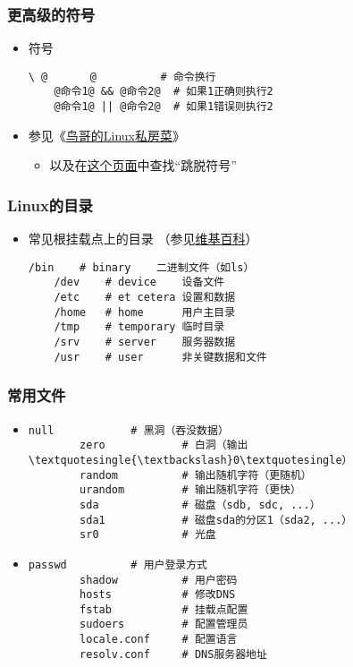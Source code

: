 \begin{CJK}{UTF8}{gbsn}
\begin{frame} [fragile]
	\frametitle{更高级的符号}
	\linespread{1.5}
	\begin{itemize}
	\item 符号
	\begin{lstlisting}[style=bashstyle, gobble=4, texcl, escapechar=@]
	\ @　　　　@		  # 命令换行
	@命令1@ && @命令2@	# 如果1正确则执行2
	@命令1@ || @命令2@	# 如果1错误则执行2
	\end{lstlisting}
	\item 参见《\href{http://cn.linux.vbird.org/linux\_basic/0320bash\_5.php}
					{鸟哥的Linux私房菜}》
		\begin{itemize}
		\item 以及在\href{http://cn.linux.vbird.org/linux\_basic/0320bash\_2.php}
						{这个页面}中查找``跳脱符号''
		\end{itemize}
	\end{itemize}
\end{frame}

\begin{frame} [fragile]
	\frametitle{Linux的目录}
	\linespread{1.25}
	\begin{itemize}
	\item 常见根挂载点上的目录
		（参见\href{https://en.wikipedia.org/wiki/Unix\_filesystem}{维基百科}）
	\begin{lstlisting}[style=bashstyle, gobble=4, texcl,
						escapebegin=\obeyspaces]
	/bin	# binary    二进制文件（如ls）
	/dev	# device    设备文件
	/etc	# et cetera 设置和数据
	/home	# home      用户主目录
	/tmp	# temporary 临时目录
	/srv	# server    服务器数据
	/usr	# user      非关键数据和文件
	\end{lstlisting}
	\end{itemize}
\end{frame}

\begin{frame} [fragile]
	\frametitle{常用文件}
	\small
	\begin{itemize}
	\item {}
		\begin{lstlisting}[style=bashstyle, gobble=8, texcl]
		null			# 黑洞（吞没数据）
		zero			# 白洞（输出\textquotesingle{\textbackslash}0\textquotesingle）
		random			# 输出随机字符（更随机）
		urandom			# 输出随机字符（更快）
		sda				# 磁盘（sdb, sdc, ...）
		sda1			# 磁盘sda的分区1（sda2, ...）
		sr0				# 光盘
		\end{lstlisting}
	\item {}
		\begin{lstlisting}[style=bashstyle, gobble=8, texcl]
		passwd			# 用户登录方式
		shadow			# 用户密码
		hosts			# 修改DNS
		fstab			# 挂载点配置
		sudoers			# 配置管理员
		locale.conf		# 配置语言
		resolv.conf		# DNS服务器地址
		\end{lstlisting}
	\end{itemize}
\end{frame}


\end{CJK}
